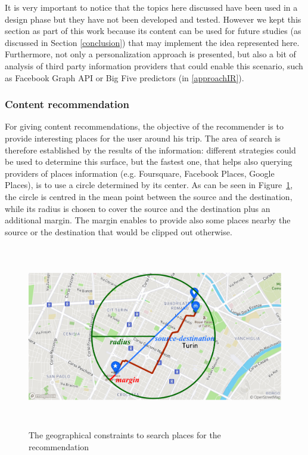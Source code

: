 It is very important to notice that the topics here discussed have been used in a design phase but they have not been developed and tested. However we kept this section as part of this work because its content can be used for future studies (as discussed in Section \ref{conclusion}) that may implement the idea represented here. Furthermore, not only a personalization approach is presented, but also a bit of analysis of third party information providers that could enable this scenario, such as Facebook Graph API or Big Five predictors (in \ref{approachIR}).

\subsubsection{Content recommendation}
\label{approachRec}

For giving content recommendations, the objective of the recommender is to provide interesting places for the user around his trip. The area of search is therefore established by the results of the information: different strategies could be used to determine this surface, but the fastest one, that helps also querying providers of places information (e.g. Foursquare, Facebook Places, Google Places), is to use a circle determined by its center. As can be seen in Figure~\ref{fig:placesSearch}, the circle is centred in the mean point between the source and the destination, while its radius is chosen to cover the source and the destination plus an additional margin. The margin enables to provide also some places nearby the source or the destination that would be clipped out otherwise.

\begin{figure}[!htb]
    \centering
    \includegraphics[max width=0.9\linewidth,max height=8cm,keepaspectratio]{figures/placesSearch}
    \caption{The geographical constraints to search places for the recommendation}\label{fig:placesSearch}
\end{figure}

